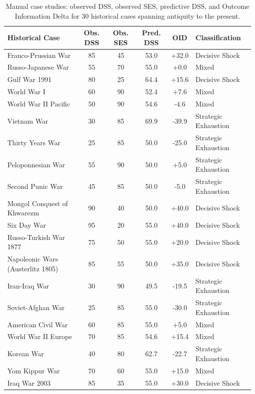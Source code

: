 \begin{table}[ht]
\centering
\caption{Manual case studies: observed DSS, observed SES, predictive DSS, and Outcome Information Delta for 30 historical cases spanning antiquity to the present.}
\label{tab:manual_case_studies}
\begin{tabularx}{\textwidth}{l c c c c X}
\toprule
\textbf{Historical Case} & \textbf{Obs. DSS} & \textbf{Obs. SES} & \textbf{Pred. DSS} & \textbf{OID} & \textbf{Classification} \\
\midrule
    Franco-Prussian War & 85 & 45 & 53.0 & +32.0 & Decisive Shock \\
    Russo-Japanese War & 55 & 70 & 55.0 & +0.0 & Mixed \\
    Gulf War 1991 & 80 & 25 & 64.4 & +15.6 & Decisive Shock \\
    World War I & 60 & 90 & 52.4 & +7.6 & Mixed \\
    World War II Pacific & 50 & 90 & 54.6 & -4.6 & Mixed \\
    Vietnam War & 30 & 85 & 69.9 & -39.9 & Strategic Exhaustion \\
    Thirty Years War & 25 & 85 & 50.0 & -25.0 & Strategic Exhaustion \\
    Peloponnesian War & 55 & 90 & 50.0 & +5.0 & Strategic Exhaustion \\
    Second Punic War & 45 & 85 & 50.0 & -5.0 & Strategic Exhaustion \\
    Mongol Conquest of Khwarezm & 90 & 40 & 50.0 & +40.0 & Decisive Shock \\
    Six Day War & 95 & 20 & 55.0 & +40.0 & Decisive Shock \\
    Russo-Turkish War 1877 & 75 & 50 & 55.0 & +20.0 & Decisive Shock \\
    Napoleonic Wars (Austerlitz 1805) & 85 & 55 & 50.0 & +35.0 & Decisive Shock \\
    Iran-Iraq War & 30 & 90 & 49.5 & -19.5 & Strategic Exhaustion \\
    Soviet-Afghan War & 25 & 85 & 55.0 & -30.0 & Strategic Exhaustion \\
    American Civil War & 60 & 85 & 55.0 & +5.0 & Mixed \\
    World War II Europe & 70 & 85 & 54.6 & +15.4 & Mixed \\
    Korean War & 40 & 80 & 62.7 & -22.7 & Strategic Exhaustion \\
    Yom Kippur War & 70 & 60 & 55.0 & +15.0 & Mixed \\
    Iraq War 2003 & 85 & 35 & 55.0 & +30.0 & Decisive Shock \\

\end{tabularx}
\end{table}
